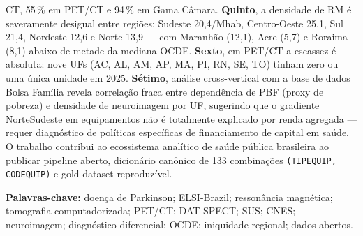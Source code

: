 \documentclass[12pt,a4paper,oneside]{article}
\begin{document}
\begin{singlespace}
CT, 55\,\% em PET/CT e 94\,\% em Gama Câmara. \textbf{Quinto}, a
densidade de RM é severamente desigual entre regiões: Sudeste
20,4/Mhab, Centro-Oeste 25,1, Sul 21,4, Nordeste 12,6 e Norte 13,9 —
com Maranhão (12,1), Acre (5,7) e Roraima (8,1) abaixo de metade da
mediana OCDE. \textbf{Sexto}, em PET/CT a escassez é absoluta: nove
UFs (AC, AL, AM, AP, MA, PI, RN, SE, TO) tinham zero ou uma única
unidade em 2025. \textbf{Sétimo}, análise cross-vertical com a base
de dados Bolsa Família revela correlação fraca entre dependência de
PBF (proxy de pobreza) e densidade de neuroimagem por UF, sugerindo
que o gradiente Norte\textendash Sudeste em equipamentos não é
totalmente explicado por renda agregada — requer diagnóstico de
políticas específicas de financiamento de capital em saúde. O
trabalho contribui ao ecossistema analítico de saúde pública
brasileira ao publicar pipeline aberto, dicionário canônico de 133
combinações \texttt{(TIPEQUIP, CODEQUIP)} e gold dataset
reproduzível.

\vspace{0.4cm}\noindent\textbf{Palavras-chave:}
doença de Parkinson; ELSI-Brazil; ressonância magnética; tomografia
computadorizada; PET/CT; DAT-SPECT; SUS; CNES; neuroimagem;
diagnóstico diferencial; OCDE; iniquidade regional; dados abertos.
\end{singlespace}

\end{document}
